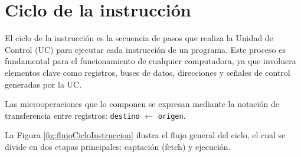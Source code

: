 \documentclass[12pt,oneside]{templates/unerthesis}
\begin{document}
\begin{table}[!h]
\centering
\caption{\label{tab:tablaregistros}Tabla de registros del simulador}
\centering
{}
\end{table}

\hypertarget{ciclo-de-la-instrucciuxf3n}{%
\section{Ciclo de la instrucción}\label{ciclo-de-la-instrucciuxf3n}}

El ciclo de la instrucción es la secuencia de pasos que realiza la Unidad de Control (UC) para ejecutar cada instrucción de un programa. Este proceso es fundamental para el funcionamiento de cualquier computadora, ya que involucra elementos clave como registros, buses de datos, direcciones y señales de control generadas por la UC.

Las microoperaciones que lo componen se expresan mediante la notación de transferencia entre registros: \texttt{destino} \(\leftarrow\) \texttt{origen}.

La Figura \ref{fig:flujoCicloInstruccion} ilustra el flujo general del ciclo, el cual se divide en dos etapas principales: captación (fetch) y ejecución.
\end{document}

